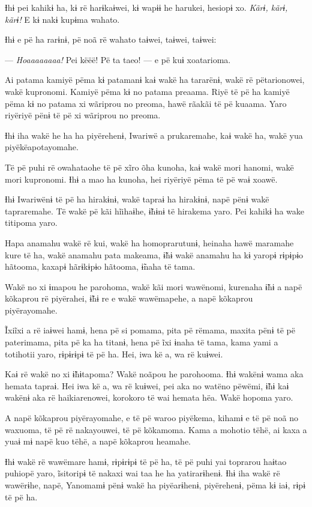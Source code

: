Ɨhɨ pei kahikɨ ha, kɨ rë harɨkaɨwei, kɨ wapɨɨ he harukei, hesiopɨ xo.
\textit{Kãrɨ, kãrɨ, kãrɨ!} E kɨ nakɨ kupɨma wahato. 

Ɨhɨ e pë ha rarɨnɨ, pë noã rë wahato taɨwei, taɨwei, taɨwei: 

--- \textit{Hoaaaaaaaa!} Pei këëë! Pë ta taeo! --- e pë kuɨ xoatarioma. 

Ai patama kamiyë pëma kɨ patamanɨ kaɨ wakë ha tararënɨ, wakë rë
pëtarionowei, wakë kupronomi. Kamiyë pëma kɨ no patama preaama. Riyë të
pë ha kamiyë pëma kɨ no patama xi wãriprou no preoma, hawë rãakãi të pë
kuaama. Yaro riyëriyë pënɨ të pë xi wãriprou no preoma. 

Ɨhɨ iha wakë he ha ha piyërehenɨ, Iwariwë a prukaremahe, kaɨ wakë ha,
wakë yua piyëkëapotayomahe. 

Të pë puhi rë owahataohe të pë xĩro õha kunoha, kaɨ wakë mori hanomi,
wakë mori kupronomi. Ɨhɨ a mao ha kunoha, hei riyëriyë pëma të pë waɨ
xoawë. 

Ɨhɨ Iwariwënɨ të pë ha hirakɨnɨ, wakë tapraɨ ha hirakɨnɨ, napë pënɨ wakë
tapraremahe. Të wakë pë kãi hĩihaɨhe, ɨ̃hɨnɨ të hirakema yaro. Pei kahikɨ
ha wake titipoma yaro.

Hapa anamahu wakë rë kui, wakë ha homoprarutunɨ, heinaha hawë maramahe
kure të ha, wakë anamahu pata makeama, ɨ̃hɨ wakë anamahu ha kɨ yaropɨ
rɨpɨpɨo hãtooma, kaxapɨ hãrɨkɨpɨo hãtooma, ɨ̃naha të tama. 

Wakë no xi ɨmapou he parohoma, wakë kãi mori wawënomi, kurenaha ɨ̃hɨ a
napë kõkaprou rë piyërahei, ɨ̃hɨ re e wakë wawëmapehe, a napë kõkaprou
piyërayomahe. 

Ĩxiĩxi a rë iaɨwei hamɨ, hena pë si pomama, pita pë rëmama, maxita pënɨ
të pë paterimama, pita pë ka ha titanɨ, hena pë ĩxi ɨnaha të tama, kama
yami a totihotii yaro, rɨpɨrɨpɨ të pë ha. Hei, iwa kë a, wa rë kuɨwei. 

Kaɨ rë wakë no xi ɨ̃hɨtapoma? Wakë noãpou he parohooma. Ɨhɨ wakënɨ wama
aka hemata tapraɨ. Hei iwa kë a, wa rë kuɨwei, pei aka no watëno pëwëmi,
ɨ̃hɨ kaɨ wakënɨ aka rë haikiarenowei, korokoro të wai hemata hëa. Wakë
hopoma yaro. 

A napë kõkaprou piyërayomahe, e të pë waroo piyëkema, kihamɨ e të pë noã
no waxuoma, të pë rë nakayouwei, të pë kõkamoma. Kama a mohotio tëhë, ai
kaxa a yuaɨ mɨ napë kuo tëhë, a napë kõkaprou heamahe. 

Ɨhɨ wakë rë wawëmare hamɨ, rɨpɨrɨpɨ të pë ha, të pë puhi yai toprarou
haɨtao puhiopë yaro, ĩsitoripɨ të nakaxi wai taa he ha yatirarɨhenɨ. Ɨhɨ
iha wakë rë wawërɨhe, napë, Yanomamɨ pënɨ wakë ha piyëarɨhenɨ,
piyërehenɨ, pëma kɨ iaɨ, rɨpɨ të pë ha. 

